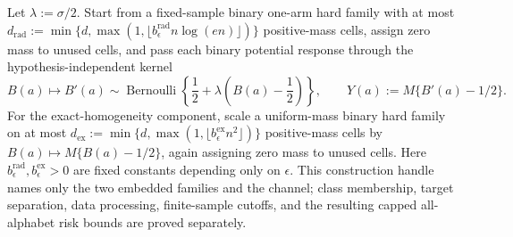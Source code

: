 Let \(\lambda:=\sigma/2\).  Start from a fixed-sample binary one-arm hard family with at most \(d_{\mathrm{rad}}:=\min\{d,\max(1,\lfloor b_{\epsilon}^{\mathrm{rad}}n\log(en)\rfloor)\}\) positive-mass cells, assign zero mass to unused cells, and pass each binary potential response through the hypothesis-independent kernel
\[
 B(a)\longmapsto B'(a)\sim\operatorname{Bernoulli}\!\left\{\frac12+\lambda\left(B(a)-\frac12\right)\right\},
 \qquad Y(a):=M\{B'(a)-1/2\}.
\]
For the exact-homogeneity component, scale a uniform-mass binary hard family on at most \(d_{\mathrm{ex}}:=\min\{d,\max(1,\lfloor b_{\epsilon}^{\mathrm{ex}}n^2\rfloor)\}\) positive-mass cells by \(B(a)\mapsto M\{B(a)-1/2\}\), again assigning zero mass to unused cells.  Here \(b_{\epsilon}^{\mathrm{rad}},b_{\epsilon}^{\mathrm{ex}}>0\) are fixed constants depending only on \(\epsilon\).  This construction handle names only the two embedded families and the channel; class membership, target separation, data processing, finite-sample cutoffs, and the resulting capped all-alphabet risk bounds are proved separately.